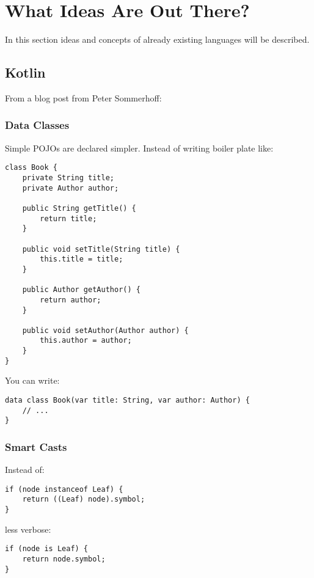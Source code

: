 \documentclass[a4paper,12pt]{article}
\begin{document}
\section{What Ideas Are Out There?}

In this section ideas and concepts of already existing languages will be described.

\subsection{Kotlin}

From a blog post from Peter Sommerhoff\cite{kotlin-sommerhoff}:

\subsubsection{Data Classes}

Simple POJOs are declared simpler. Instead of writing boiler plate like:

\begin{verbatim}
class Book {
    private String title;
    private Author author;

    public String getTitle() {
        return title;
    }
    
    public void setTitle(String title) {
        this.title = title;
    }

    public Author getAuthor() {
        return author;
    }
    
    public void setAuthor(Author author) {
        this.author = author;
    }
}
\end{verbatim}

You can write:

\begin{verbatim}
data class Book(var title: String, var author: Author) {
    // ...
}	
\end{verbatim}

\subsubsection{Smart Casts}

Instead of:

\begin{verbatim}
if (node instanceof Leaf) {
    return ((Leaf) node).symbol;
}	
\end{verbatim}

less verbose:

\begin{verbatim}
if (node is Leaf) {
    return node.symbol;
}	
\end{verbatim}
\end{document}
